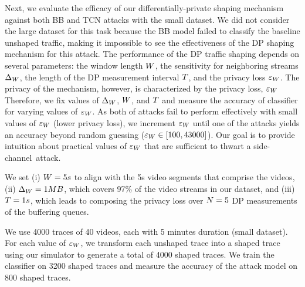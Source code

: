 Next, we evaluate the efficacy of our differentially-private shaping mechanism against both BB and TCN attacks with the small dataset.
We did not consider the large dataset for this task because the BB model failed to classify the baseline unshaped traffic, making it impossible to see the effectiveness of the DP shaping mechanism for this attack.
The performance of the DP traffic shaping depends on several parameters: the window length $W$, the sensitivity for neighboring streams $\Delta_{W}$, the length of the DP measurement interval $T$, and the privacy loss $\varepsilon_{W}$.
The privacy of the mechanism, however, is characterized by the privacy loss, $\varepsilon_{W}$
Therefore, we fix values of $\Delta_{W}$, $W$, and $T$ and measure the accuracy of classifier for varying values of $\varepsilon_{W}$.
As both of attacks fail to perform effectively with small values of $\varepsilon_{W}$ (\ie lower privacy loss), we increment $\varepsilon_{W}$ until one of the attacks yields an accuracy beyond random guessing (\ie $\varepsilon_{W} \in [100, 43000]$).
Our goal is to provide intuition about practical values of $\varepsilon_{W}$ that are sufficient to thwart a side-channel~attack.

We set (i) $W = 5s$ to align with the 5s video segments that comprise the videos, (ii) $\Delta_{W} = 1 MB$, which covers 97\% of the video streams in our dataset, and (iii) $T = 1s$, which leads to composing the privacy loss over $N = 5$ DP measurements of the buffering queues.

We use 4000 traces of 40 videos, each with 5 minutes duration (\ie small dataset).
For each value of $\varepsilon_{W}$, we transform each unshaped trace into a shaped trace using our simulator to generate a total of 4000 shaped traces.
We train the classifier on 3200 shaped traces and measure the accuracy of the attack model on 800 shaped traces.

